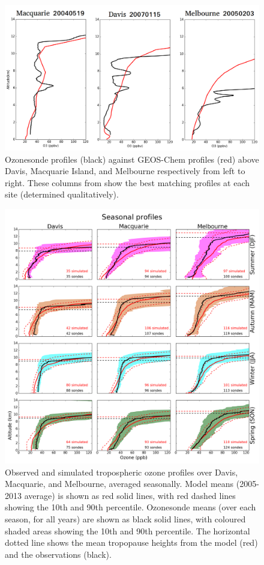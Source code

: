     \begin{figure}[!htbp]
      \includegraphics[width=\textwidth]{Figures/Ozone/event_profile_comparison.png}
      \caption{Ozonesonde profiles (black) against GEOS-Chem profiles (red) above Davis, Macquarie Island, and Melbourne respectively from left to right.
      These columns from show the best matching profiles at each site (determined qualitatively).}
      \label{ch_o3:fig:event_profile_comparison}
    \end{figure}
    
    \begin{figure}[!htbp]
      \includegraphics[width=\textwidth]{Figures/Ozone/seasonalprofiles00.png}
      \caption{Observed and simulated tropospheric ozone profiles over Davis, Macquarie, and Melbourne, averaged seasonally.
          Model means (2005-2013 average) is shown as red solid lines, with red dashed lines showing the 10th and 90th percentile.
          Ozonesonde means (over each season, for all years) are shown as black solid lines, with coloured shaded areas showing the 10th and 90th percentile.
          The horizontal dotted line shows the mean tropopause heights from the model (red) and the observations (black).}
      \label{ch_o3:fig:GEOSChemEventProfilesSummary}
    \end{figure}
    
